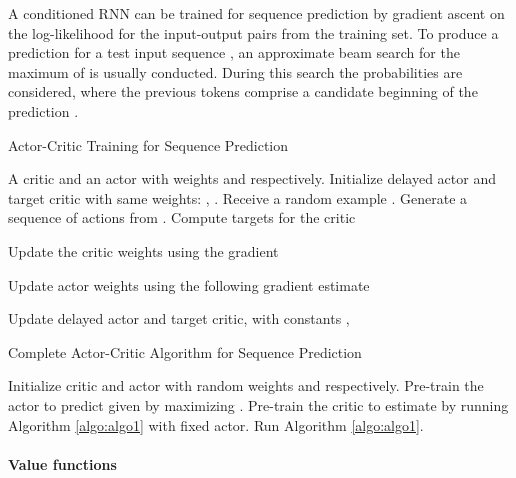 \documentclass{article} \usepackage{iclr2017_conference,times}
\begin{document}
A conditioned RNN can be trained for sequence prediction by gradient ascent on
the log-likelihood  for the input-output pairs  from the
training set. To produce a prediction  for a test input sequence , an approximate
beam search for the maximum of  is usually conducted. During this
search the probabilities  are considered,
where the previous tokens  comprise a candidate
beginning of the prediction . 



\begin{algorithm}
    \caption{Actor-Critic Training for Sequence Prediction}
    \label{algo:algo1}
    \begin{algorithmic}[1]
    \REQUIRE 
        A critic 
        and an actor  with
        weights  and  respectively.
    \STATE Initialize delayed actor  
    and target critic  with same weights: , .
    \STATE Receive a random example .
    \STATE Generate a sequence of actions  from .
    \STATE Compute targets for the critic
           
    \STATE Update the critic weights  using the gradient
    
    \STATE Update actor weights  using the following gradient estimate
    
    \STATE Update delayed actor and target critic, with constants 
    , 
        
    \ENDWHILE
    \end{algorithmic}
\end{algorithm}

\begin{algorithm}
    \caption{Complete Actor-Critic Algorithm for Sequence Prediction}
    \label{algo:algo2}
    \begin{algorithmic}[1]
    \STATE 
        Initialize critic 
        and actor  with
        random weights  and  respectively.
    \STATE 
        Pre-train the actor to predict  given 
         by maximizing 
        .
    \STATE 
        Pre-train the critic to estimate  by running Algorithm \ref{algo:algo1}
        with fixed actor.
    \STATE
        Run Algorithm \ref{algo:algo1}.
    \end{algorithmic}
\end{algorithm}



\paragraph{Value functions}
\end{document}
